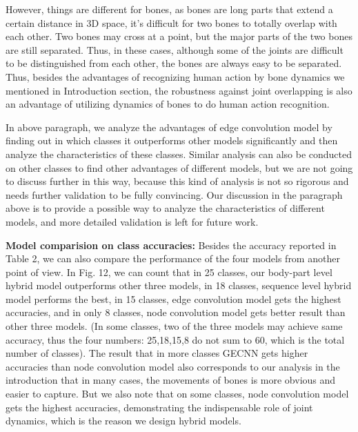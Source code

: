 \documentclass[a4paper,11pt]{article}
\begin{document}
 However, things are different for bones, as bones are long parts that extend a certain distance in 3D space, it's difficult for two bones to totally overlap with each other. Two bones may cross at a point, but the major parts of the two bones are still separated. Thus, in these cases, although some of the joints are difficult to be distinguished from each other, the bones are always easy to be separated. Thus, besides the advantages of recognizing human action by bone dynamics we mentioned in Introduction section, the robustness against joint overlapping is also an advantage of utilizing dynamics of bones to do human action recognition.

In above paragraph, we analyze the advantages of edge convolution model by finding out in which classes it outperforms other models significantly and then analyze the characteristics of these classes. Similar analysis can also be conducted on other classes to find other advantages of different models, but we are not going to discuss further in this way, because this kind of analysis is not so rigorous and needs further validation to be fully convincing. Our discussion in the paragraph above is to provide a possible way to analyze the characteristics of different models, and more detailed validation is left for future work.

{\bf Model comparision on class accuracies:}
Besides the accuracy reported in Table 2, we can also compare the performance of the four models from another point of view. In Fig. 12, we can count that in 25 classes, our body-part level hybrid model outperforms other three models, in 18 classes, sequence level hybrid model performs the best, in 15 classes, edge convolution model gets the highest accuracies, and in only 8 classes, node convolution model gets better result than other three models. (In some classes, two of the three models may achieve same accuracy, thus the four numbers: 25,18,15,8 do not sum to 60, which is the total number of classes).
The result that in more classes GECNN gets higher accuracies than node convolution model also corresponds to our analysis in the introduction that in many cases, the movements of bones is more obvious and easier to capture. 
But we also note that on some classes, node convolution model gets the highest accuracies, demonstrating the indispensable role of joint dynamics, which is the reason we design hybrid models.
\end{document}
